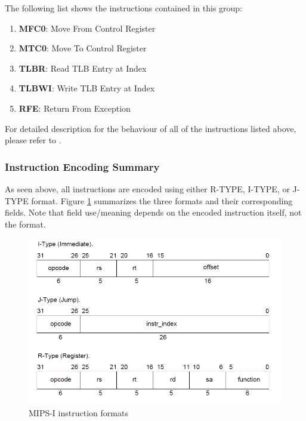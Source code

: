 \documentclass[oneside]{book}
\begin{document}
The following list shows the instructions contained in this group:

\begin{enumerate}

\item \textbf{MFC0}:  Move From Control Register
\item \textbf{MTC0}:  Move To Control Register
\item \textbf{TLBR}:  Read TLB Entry at Index
\item \textbf{TLBWI}: Write TLB Entry at Index
\item \textbf{RFE}:   Return From Exception

\end{enumerate}

For detailed description for the behaviour of all of the instructions listed
above, please refer to \cite{mips_isa}.

\subsubsection{Instruction Encoding Summary}

As seen above, all instructions are encoded using either R-TYPE, I-TYPE,
or J-TYPE format. Figure \ref{formats} summarizes the three formats and their
corresponding fields. Note that field use/meaning depends on the
encoded instruction itself, not the format.\\

\begin{figure}[H]
\begin{center}
\includegraphics[width=\textwidth]{formats.png}
\end{center}
\caption{MIPS-I instruction formats}
\label{formats}
\end{figure}
\end{document}
